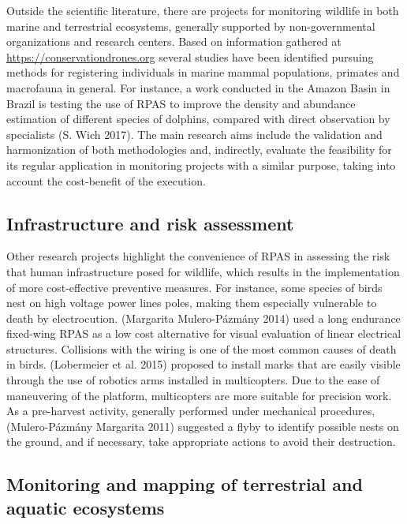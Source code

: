 \documentclass[]{interact}
\theoremstyle{plain}%
\theoremstyle{definition}
\theoremstyle{remark}
\begin{document}
Outside the scientific literature, there are projects for monitoring
wildlife in both marine and terrestrial ecosystems, generally supported
by non-governmental organizations and research centers. Based on
information gathered at \url{https://conservationdrones.org} several
studies have been identified pursuing methods for registering
individuals in marine mammal populations, primates and macrofauna in
general. For instance, a work conducted in the Amazon Basin in Brazil is
testing the use of RPAS to improve the density and abundance estimation
of different species of dolphins, compared with direct observation by
specialists (S. Wich 2017). The main research aims include the
validation and harmonization of both methodologies and, indirectly,
evaluate the feasibility for its regular application in monitoring
projects with a similar purpose, taking into account the cost-benefit of
the execution.



\subsection{Infrastructure and risk
assessment}\label{infrastructure-and-risk-assessment}

Other research projects highlight the convenience of RPAS in assessing
the risk that human infrastructure posed for wildlife, which results in
the implementation of more cost-effective preventive measures. For
instance, some species of birds nest on high voltage power lines poles,
making them especially vulnerable to death by electrocution. (Margarita
Mulero-Pázmány 2014) used a long endurance fixed-wing RPAS as a low cost
alternative for visual evaluation of linear electrical structures.
Collisions with the wiring is one of the most common causes of death in
birds. (Lobermeier et al. 2015) proposed to install marks that are
easily visible through the use of robotics arms installed in
multicopters. Due to the ease of maneuvering of the platform,
multicopters are more suitable for precision work. As a pre-harvest
activity, generally performed under mechanical procedures,
(Mulero-Pázmány Margarita 2011) suggested a flyby to identify possible
nests on the ground, and if necessary, take appropriate actions to avoid
their destruction.

\subsection{Monitoring and mapping of terrestrial and aquatic
ecosystems}\label{monitoring-and-mapping-of-terrestrial-and-aquatic-ecosystems}
\end{document}
